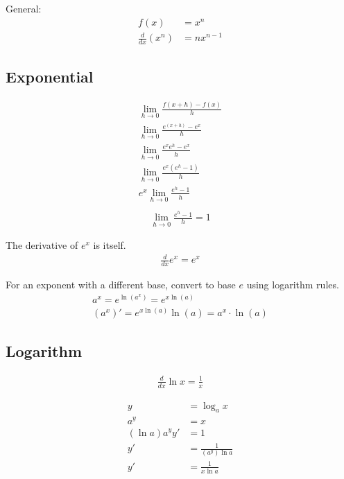 \documentclass{article}
\theoremstyle{mytheoremstyle}
\theoremstyle{mytheoremstyle}
\theoremstyle{myproblemstyle}
\begin{document}
    General:
    \begin{align*}
        f(x) &= x^n \\
        \frac{d}{dx} (x^n) &= nx^{n-1}
    \end{align*}

    \subsection*{Exponential}
    \begin{align*}
        \lim_{h\to 0} \frac{f(x+h)-f(x)}{h} \\
        \lim_{h\to 0} \frac{e^(x+h) - e^x}{h} \\
        \lim_{h\to 0} \frac{e^x e^h - e^x}{h} \\
        \lim_{h\to 0} \frac{e^x (e^h - 1)}{h} \\
        e^x \lim_{h\to 0} \frac{e^h - 1}{h} \\
    \end{align*}
    \begin{align*}
        \lim_{h\to 0} \frac{e^h - 1}{h} = 1
    \end{align*}

    The derivative of $e^x$ is itself.
    \begin{align*}
        \frac{d}{dx} e^x = e^x
    \end{align*}

    For an exponent with a different base, convert to base $e$ using logarithm
    rules.
    \begin{align*}
        a^x = e^{\ln (a^x)} = e^{x \ln(a)} \\
        (a^x)' = e^{x\ln(a)}\ln(a) = a^x \cdot \ln(a)
    \end{align*}

    \subsection*{Logarithm}

    \begin{align*}
        \frac{d}{dx} \ln x = \frac{1}{x}
    \end{align*}

    \begin{align*}
        y              &= \log_a x \\
        a^y            &= x \\
        (\ln a) a^y y' &= 1 \\
        y'             &= \frac{1}{(a^y)\ln a} \\
        y'             &= \frac{1}{x\ln a} \\
    \end{align*}
\end{document}
